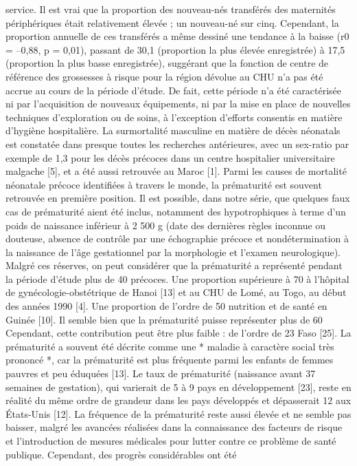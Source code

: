 service. Il est vrai que la proportion des nouveau-nés
transférés des maternités périphériques était relativement
élevée ; un nouveau-né sur cinq. Cependant, la proportion
annuelle de ces transférés a même dessiné une tendance à la
baisse (r0 = –0,88, p = 0,01), passant de 30,1 %
(proportion la plus élevée enregistrée) à 17,5 %
(proportion la plus basse enregistrée), suggérant que la
fonction de centre de référence des grossesses à risque pour
la région dévolue au CHU n’a pas été accrue au cours de
la période d’étude. De fait, cette période n’a été caractérisée
ni par l’acquisition de nouveaux équipements, ni par la mise
en place de nouvelles techniques d’exploration ou de soins,
à l’exception d’efforts consentis en matière d’hygiène
hospitalière.
La surmortalité masculine en matière de décès néonatals
est constatée dans presque toutes les recherches antérieures,
avec un sex-ratio par exemple de 1,3 pour les décès précoces
dans un centre hospitalier universitaire malgache [5], et a été
aussi retrouvée au Maroc [1].
Parmi les causes de mortalité néonatale précoce identifiées
à travers le monde, la prématurité est souvent retrouvée en
première position. Il est possible, dans notre série, que
quelques faux cas de prématurité aient été inclus, notamment
des hypotrophiques à terme d’un poids de naissance inférieur
à 2 500 g (date des dernières règles inconnue ou douteuse,
absence de contrôle par une échographie précoce et nondétermination
à la naissance de l’âge gestationnel par la
morphologie et l’examen neurologique). Malgré ces réserves,
on peut considérer que la prématurité a représenté
pendant la période d’étude plus de 40 %
précoces. Une proportion supérieure à 70 %
à l’hôpital de gynécologie-obstétrique de Hanoi [13] et au
CHU de Lomé, au Togo, au début des années 1990 [4]. Une
proportion de l’ordre de 50 %
nutrition et de santé en Guinée [10].
Il semble bien que la prématurité puisse représenter plus
de 60 %
Cependant, cette contribution peut être plus faible : de
l’ordre de 23 %
Faso [25].
La prématurité a souvent été décrite comme une * maladie
à caractère social très prononcé *, car la prématurité est plus
fréquente parmi les enfants de femmes pauvres et peu
éduquées [13]. Le taux de prématurité (naissance avant
37 semaines de gestation), qui varierait de 5 à 9 %
pays en développement [23], reste en réalité du même ordre
de grandeur dans les pays développés et dépasserait 12 %
aux États-Unis [12].
La fréquence de la prématurité reste aussi élevée et ne
semble pas baisser, malgré les avancées réalisées dans la
connaissance des facteurs de risque et l’introduction de
mesures médicales pour lutter contre ce problème de santé
publique. Cependant, des progrès considérables ont été


